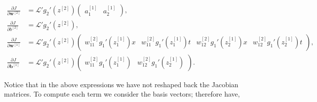 \documentclass{article}
\begin{document}
\begin{align}
\label{dJdw2mat_fw}
\frac{\partial J}{\partial \textbf{w}^{[2]}} &= 
\mathcal{L}'
g_2'(z^{[2]})
\begin{pmatrix}
a_1^{[1]} & a_2^{[1]} 
\end{pmatrix}, \\
\frac{\partial J}{\partial b^{[2]}} &=
\mathcal{L}'
g_2'(z^{[2]}),\\
\frac{\partial J}{\partial \textbf{w}^{[1]}} &= 
\mathcal{L}'
g_2'(z^{[2]}) 
\begin{pmatrix}
w_{11}^{[2]}  g_1'(z_1^{[1]}) x & w_{11}^{[2]} g_1'(z_1^{[1]}) t & w_{12}^{[2]} g_1'(z_2^{[1]}) x &  w_{12}^{[2]} g_1'(z_2^{[1]}) t
\end{pmatrix}, 
\label{dJdw1mat_fw}
\\ 
\frac{\partial J}{\partial \textbf{b}^{[1]}} &= 
\mathcal{L}'
g_2'(z^{[2]}) 
\begin{pmatrix}
w_{11}^{[2]} g_1'(z_1^{[1]}) & w_{12}^{[2]} g_1'(z_2^{[1]}) 
\end{pmatrix}.
\label{dJdb1mat_fw}
\end{align}

Notice that in the above expressions we have not reshaped back the Jacobian matrices. To compute each term we consider the basis vectors; therefore have,
\end{document}
